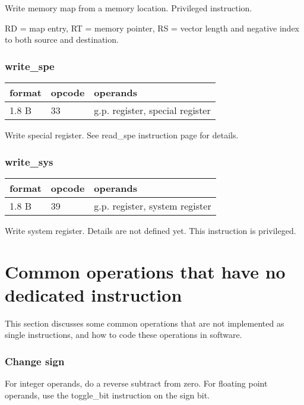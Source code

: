 \documentclass[forwardcom.tex]{subfiles}
\begin{document}
Write memory map from a memory location. Privileged instruction.
\vspace{2mm}

RD = map entry, RT = memory pointer, RS = vector length and
negative index to both source and destination.

\subsubsection{write\_spe}
\label{table:writeSpeInstruction}
\begin{tabular}{|p{12mm}|p{12mm}|p{110mm}|}
\hline
\bfseries format & \bfseries opcode & \bfseries operands \\ \hline
1.8 B & 33 & g.p. register, special register \\ \hline
\end{tabular}
\vspace{2mm}

Write special register. See read\_spe instruction page \pageref{table:readSpeInstruction} for details.

\subsubsection{write\_sys}
\label{table:writeSysInstruction}
\begin{tabular}{|p{12mm}|p{12mm}|p{110mm}|}
\hline
\bfseries format & \bfseries opcode & \bfseries operands \\ \hline
1.8 B & 39 & g.p. register, system register \\ \hline
\end{tabular}
\vspace{2mm}

Write system register. Details are not defined yet. This instruction is privileged.
\vspace{2mm}


\section{Common operations that have no dedicated instruction}
This section discusses some common operations that are not implemented as single instructions, and how to code these operations in software.

\subsubsection{Change sign}
For integer operands, do a reverse subtract from zero. For floating point operands, use the toggle\_bit instruction on the sign bit.
\end{document}
